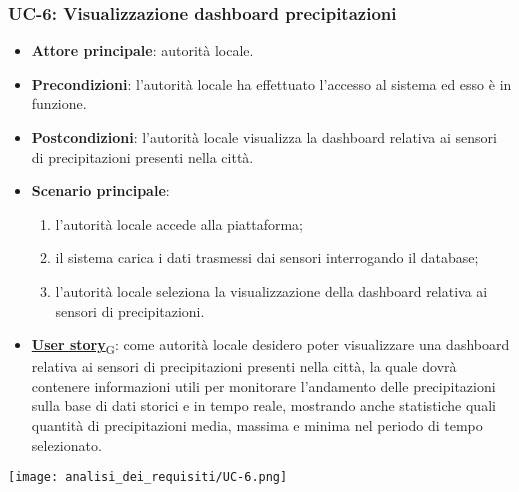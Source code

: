 \subsubsection{UC-6: Visualizzazione dashboard precipitazioni}
\begin{itemize}
	\item \textbf{Attore principale}: autorità locale.
	\item \textbf{Precondizioni}: l'autorità locale ha effettuato l'accesso al sistema ed esso è in funzione.
	\item \textbf{Postcondizioni}: l'autorità locale visualizza la dashboard relativa
	      ai sensori di precipitazioni presenti nella città.
	\item \textbf{Scenario principale}:
	      \begin{enumerate}
		      \item l'autorità locale accede alla piattaforma;
		      \item il sistema carica i dati trasmessi dai sensori interrogando il database;
		      \item l'autorità locale seleziona la visualizzazione della dashboard relativa ai sensori di precipitazioni.
	      \end{enumerate}
	\item \href{https://7last.github.io/docs/rtb/documentazione-interna/glossario\#user-story}{\textbf{User story}\textsubscript{G}}:
	      come autorità locale desidero poter visualizzare una dashboard relativa ai sensori di precipitazioni presenti nella città, la quale
	      dovrà contenere informazioni utili per monitorare l'andamento delle precipitazioni sulla base di dati storici e in tempo reale, mostrando
	      anche statistiche quali quantità di precipitazioni media, massima e minima nel periodo di tempo selezionato.
\end{itemize}
\begin{center}
	\texttt{[image: analisi\_dei\_requisiti/UC-6.png]}
\end{center}


